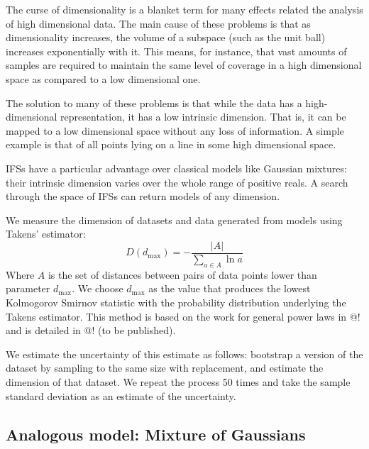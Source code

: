 \documentclass[11pt]{article}
\theoremstyle{definition}
\begin{document}
The curse of dimensionality is a blanket term for many effects related the analysis of high dimensional data. The main cause of these problems is that as dimensionality increases, the volume of a subspace (such as the unit ball) increases exponentially with it. This means, for instance, that vast amounts of samples are required to maintain the same level of coverage in a high dimensional space as compared to a low dimensional one. 

The solution to many of these problems is that while the data has a high-dimensional representation, it has a low intrinsic dimension. That is, it can be mapped to a low dimensional space without any loss of information. A simple example is that of all points lying on a line in some high dimensional space. 

IFSs have a particular advantage over classical models like Gaussian mixtures: their intrinsic dimension varies over the whole range of positive reals. A search through the space of IFSs can return models of any dimension.

We measure the dimension of datasets and data generated from models using Takens' estimator:
\[
D(d_{\mbox{max}}) = -\frac{|A|}{\sum_{a \in A} \ln a} 
\]
Where $A$ is the set of distances between pairs of data points lower than parameter $d_{\mbox{max}}$. We choose $d_{\mbox{max}}$ as the value that produces the lowest Kolmogorov Smirnov statistic with the probability distribution underlying the Takens estimator. This method is based on the work for general power laws in @! and is detailed in @! (to be published). 

We estimate the uncertainty of this estimate as follows: bootstrap a version of the dataset by sampling to the same size with replacement, and estimate the dimension of that dataset. We repeat the process 50 times and take the sample standard deviation as an estimate of the uncertainty.

\subsection{Analogous model: Mixture of Gaussians}
\end{document}
